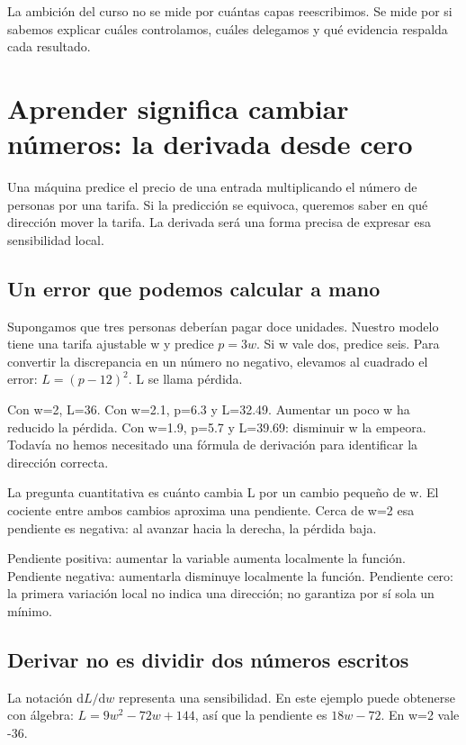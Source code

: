 \documentclass[12pt,a4paper,oneside]{report}
\newcommand{\dd}{\mathrm{d}}
\begin{document}
La ambición del curso no se mide por cuántas capas reescribimos. Se mide por si sabemos explicar cuáles controlamos, cuáles delegamos y qué evidencia respalda cada resultado.


\chapter{Aprender significa cambiar números: la derivada desde cero}
\label{ch:derivada}
\begin{idea}
Una máquina predice el precio de una entrada multiplicando el número de personas por una tarifa. Si la predicción se equivoca, queremos saber en qué dirección mover la tarifa. La derivada será una forma precisa de expresar esa sensibilidad local.

\end{idea}
\section{Un error que podemos calcular a mano}
Supongamos que tres personas deberían pagar doce unidades. Nuestro modelo tiene una tarifa ajustable w y predice $p=3w$. Si w vale dos, predice seis. Para convertir la discrepancia en un número no negativo, elevamos al cuadrado el error: $L=(p-12)^2$. L se llama pérdida.

Con w=2, L=36. Con w=2.1, p=6.3 y L=32.49. Aumentar un poco w ha reducido la pérdida. Con w=1.9, p=5.7 y L=39.69: disminuir w la empeora. Todavía no hemos necesitado una fórmula de derivación para identificar la dirección correcta.

La pregunta cuantitativa es cuánto cambia L por un cambio pequeño de w. El cociente entre ambos cambios aproxima una pendiente. Cerca de w=2 esa pendiente es negativa: al avanzar hacia la derecha, la pérdida baja.

\begin{traduccion}
Pendiente positiva: aumentar la variable aumenta localmente la función. Pendiente negativa: aumentarla disminuye localmente la función. Pendiente cero: la primera variación local no indica una dirección; no garantiza por sí sola un mínimo.

\end{traduccion}
\section{Derivar no es dividir dos números escritos}
La notación $\dd L/\dd w$ representa una sensibilidad. En este ejemplo puede obtenerse con álgebra: $L=9w^2-72w+144$, así que la pendiente es $18w-72$. En w=2 vale -36.
\end{document}
